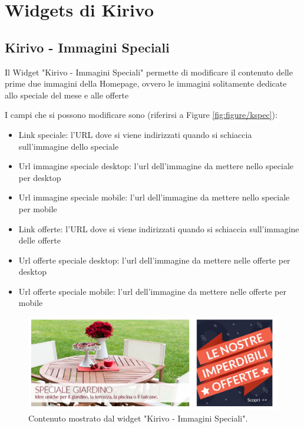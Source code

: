 




\newpage
\section{Widgets di Kirivo}


\subsection{Kirivo - Immagini Speciali}

Il Widget "Kirivo - Immagini Speciali" permette di modificare il contenuto
delle prime due immagini della Homepage, ovvero le immagini solitamente dedicate
allo speciale del mese e alle offerte 

I campi che si possono modificare sono (riferirsi a Figure \ref{fig:figure/kspec}):
\begin{itemize}
\item Link speciale: l'URL dove si viene indirizzati quando si schiaccia sull'immagine dello speciale
\item Url immagine speciale desktop: l'url dell'immagine da mettere nello speciale per desktop
\item Url immagine speciale mobile: l'url dell'immagine da mettere nello speciale per mobile
\item Link offerte: l'URL dove si viene indirizzati quando si schiaccia sull'immagine delle offerte
\item Url offerte speciale desktop: l'url dell'immagine da mettere nelle offerte per desktop
\item Url offerte speciale mobile: l'url dell'immagine da mettere nelle offerte per mobile
\end{itemize}

\begin{figure}
  \includegraphics[width=\textwidth]{figure/kspec.png}
  \caption{Contenuto mostrato dal widget "Kirivo - Immagini Speciali".}
  \label{fig:kspec}
\end{figure}

